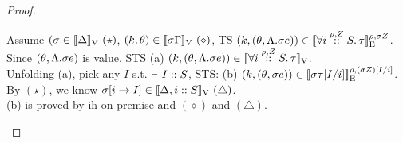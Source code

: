\documentclass[a4paper,11pt]{article}
\theoremstyle{definition}
\begin{document}
\begin{proof}
\begin{mainitem}
Assume $(\ienv \in \lrv{\Delta}~(\star)$, $(\stepiA, \env) \in \lrv{\ienv \Gamma } ~ (\diamond)$, TS $(\stepiA, (\env, \eilam \ienv \expr)) \in \lre{\dmap}{\ienv \nnatA}{\tforall{\dmap}{\nnatA}{i} \type} $.\\
%
Since $(\env, \eilam \ienv \expr)$ is value, STS (a) $(\stepiA, (\env, \eilam \ienv \expr)) \in \lrv{\tforall{\dmap}{\nnatA}{i} \type}$.\\
%
Unfolding (a), pick any $I$ s.t. $\tvdash{} I :: S$, STS: (b) $(\stepiA, (\env, \ienv \expr)) \in \lre{\dmap}{(\ienv \nnatA)[I/i]}{\ienv \type [I/i]}$.\\
%
By $(\star)$, we know $\ienv[i \to I] \in \lrv{\Delta, i::S} ~ (\triangle)$.\\
%
(b) is proved by ih on premise and $(\diamond)$ and $(\triangle)$.\\




\end{mainitem}
\end{proof}
\end{document}
